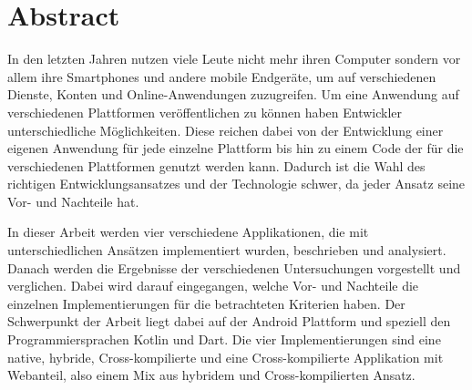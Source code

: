 \chapter*{Abstract}

\bigskip 

In den letzten Jahren nutzen viele Leute nicht mehr ihren Computer sondern vor allem ihre Smartphones und andere mobile Endgeräte, um auf verschiedenen Dienste, Konten und Online-Anwendungen zuzugreifen. Um eine Anwendung auf verschiedenen Plattformen veröffentlichen zu können haben Entwickler unterschiedliche Möglichkeiten. Diese reichen dabei von der Entwicklung einer eigenen Anwendung für jede einzelne Plattform bis hin zu einem Code der für die verschiedenen Plattformen genutzt werden kann. Dadurch ist die Wahl des richtigen Entwicklungsansatzes und der Technologie schwer, da jeder Ansatz seine Vor- und Nachteile hat. 

In dieser Arbeit werden vier verschiedene Applikationen, die mit unterschiedlichen Ansätzen implementiert wurden, beschrieben und analysiert. Danach werden die Ergebnisse der verschiedenen Untersuchungen vorgestellt und verglichen. Dabei wird darauf eingegangen, welche Vor- und Nachteile die einzelnen Implementierungen für die betrachteten Kriterien haben. Der Schwerpunkt der Arbeit liegt dabei auf der Android Plattform und speziell den Programmiersprachen Kotlin und Dart. Die vier Implementierungen sind eine native, hybride, Cross-kompilierte und eine Cross-kompilierte Applikation mit Webanteil, also einem Mix aus hybridem und Cross-kompilierten Ansatz.